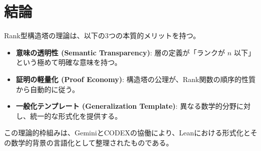 \documentclass[report, paper=a4, fontsize=11pt, openany]{jlreq}
\begin{document}
\chapter{結論}

Rank型構造塔の理論は、以下の3つの本質的メリットを持つ。

\begin{itemize}
    \item \textbf{意味の透明性 (Semantic Transparency)}: 層の定義が「ランクが $n$ 以下」という極めて明確な意味を持つ。
    \item \textbf{証明の軽量化 (Proof Economy)}: 構造塔の公理が、Rank関数の順序的性質から自動的に従う。
    \item \textbf{一般化テンプレート (Generalization Template)}: 異なる数学的分野に対し、統一的な形式化を提供する。
\end{itemize}

この理論的枠組みは、GeminiとCODEXの協働により、Leanにおける形式化とその数学的背景の言語化として整理されたものである。
\end{document}
